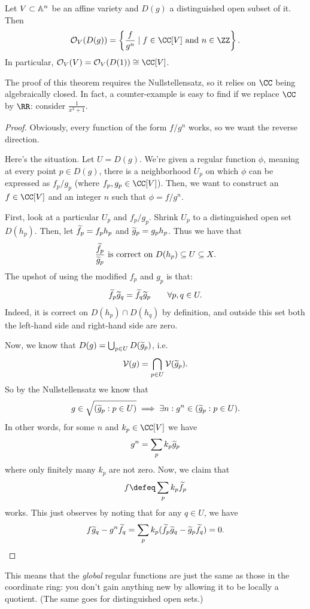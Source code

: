 \documentclass[11pt]{scrreprt}
\begin{document}
\begin{theorem}
	\label{thm:reg_func_distinguish_open}
	Let $V \subset \mathbb A^n$ be an affine variety
	and $D(g)$ a distinguished open subset of it.
	Then
	\[
		\OO_V( D(g) )
		=
		\left\{ \frac{f}{g^n} \mid f \in \CC[V] \text{ and } n \in \ZZ \right\}.
	\]
	In particular, $\OO_V(V) = \OO_V(D(1)) \cong \CC[V]$.
\end{theorem}
The proof of this theorem requires the Nullstellensatz,
so it relies on $\CC$ being algebraically closed.
In fact, a counter-example is easy to find if we replace $\CC$ by $\RR$:
consider $\frac{1}{x^2+1}$.
\begin{proof}
	Obviously, every function of the form $f/g^n$ works,
	so we want the reverse direction.

	Here's the situation.
	Let $U = D(g)$.
	We're given a regular function $\phi$, meaning at every point $p \in D(g)$,
	there is a neighborhood $U_p$ on which $\phi$ can be expressed
	as $f_p / g_p$ (where $f_p, g_p \in \CC[V]$).
	Then, we want to construct an $f \in \CC[V]$ and an integer $n$
	such that $\phi = f/g^n$.

	First, look at a particular $U_p$ and $f_p / g_p$.
	Shrink $U_p$ to a distinguished open set $D(h_p)$.
	Then, let $\widetilde f_p = f_p h_p$ and $\widetilde g_p = g_p h_p$.
	Thus we have that
	\[ \frac{\widetilde f_p}{\widetilde g_p} \text{ is correct on }
		D(h_p) \subseteq U \subseteq X. \]
	The upshot of using the modified $f_p$ and $g_p$ is that:
	\[ \widetilde f_p \widetilde g_q = \widetilde f_q \widetilde g_p \qquad \forall p,q \in U. \]
	Indeed, it is correct on $D(h_p) \cap D(h_q)$ by definition,
	and outside this set both the left-hand side and right-hand side are zero.

	Now, we know that $D(g) = \bigcup_{p \in U} D(\widetilde g_p)$, i.e.\
	\[ \mathcal V(g) = \bigcap_{p \in U} \mathcal V(\widetilde g_p). \]
	So by the Nullstellensatz we know that
	\[ g \in \sqrt{(\widetilde g_p : p \in U)}
		\implies \exists n : g^n \in (\widetilde g_p : p \in U). \]
	In other words, for some $n$ and $k_p \in \CC[V]$ we have
	\[ g^n = \sum_p k_p \widetilde g_p \]
	where only finitely many $k_p$ are not zero.
	Now, we claim that
	\[ f \defeq \sum_p k_p \wt f_p \]
	works.
	This just observes by noting that for any $q \in U$, we have
	\[
		f \widetilde g_q - g^n \widetilde f_q
		= \sum_p k_p(\widetilde f_p \widetilde g_q - \widetilde g_p \widetilde f_q)
		= 0. \qedhere
	\]
\end{proof}
This means that the \emph{global} regular functions
are just the same as those in the coordinate ring:
you don't gain anything new by allowing it to be locally a quotient.
(The same goes for distinguished open sets.)
\end{document}
